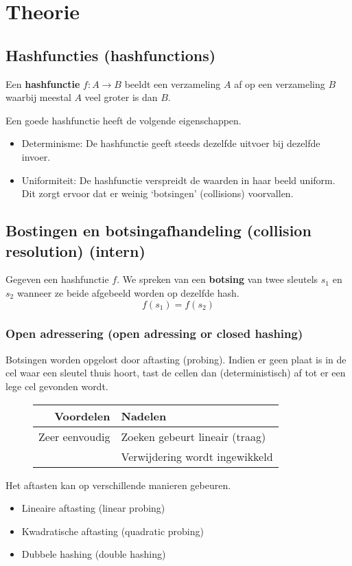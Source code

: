 \documentclass[hashing.tex]{subfiles}
\begin{document}
\chapter{Theorie}


\section{Hashfuncties (hashfunctions)}
\begin{de}
Een \textbf{hashfunctie} $f:A\rightarrow B$ beeldt een verzameling $A$ af op een verzameling $B$ waarbij meestal $A$ veel groter is dan $B$.
\end{de}
Een goede hashfunctie heeft de volgende eigenschappen.
\begin{itemize}
\item Determinisme: De hashfunctie geeft steeds dezelfde uitvoer bij dezelfde invoer.
\item Uniformiteit: De hashfunctie verspreidt de waarden in haar beeld uniform. Dit zorgt ervoor dat er weinig `botsingen' (collisions) voorvallen.
\end{itemize}

\section{Bostingen en botsingafhandeling (collision resolution) (intern)}
\begin{de}
Gegeven een hashfunctie $f$. We spreken van een \textbf{botsing} van twee sleutels $s_1$ en $s_2$ wanneer ze beide afgebeeld worden op dezelfde hash.
\[
f(s_1) = f(s_2)
\]
\end{de}
\subsection{Open adressering (open adressing or closed hashing)}
Botsingen worden opgelost door aftasting (probing). Indien er geen plaat is in de cel waar een sleutel thuis hoort, tast de cellen dan (deterministisch) af tot er een lege cel gevonden wordt. 
\begin{figure}[H]
\centering
\begin{tabular}{r|l}
Voordelen & Nadelen\\
\hline
Zeer eenvoudig & Zoeken gebeurt lineair (traag)\\
& Verwijdering wordt ingewikkeld
\end{tabular}
\end{figure}
Het aftasten kan op verschillende manieren gebeuren.
\begin{itemize}
\item Lineaire aftasting (linear probing)
\item Kwadratische aftasting (quadratic probing)
\item Dubbele hashing (double hashing)
\end{itemize}
\end{document}
